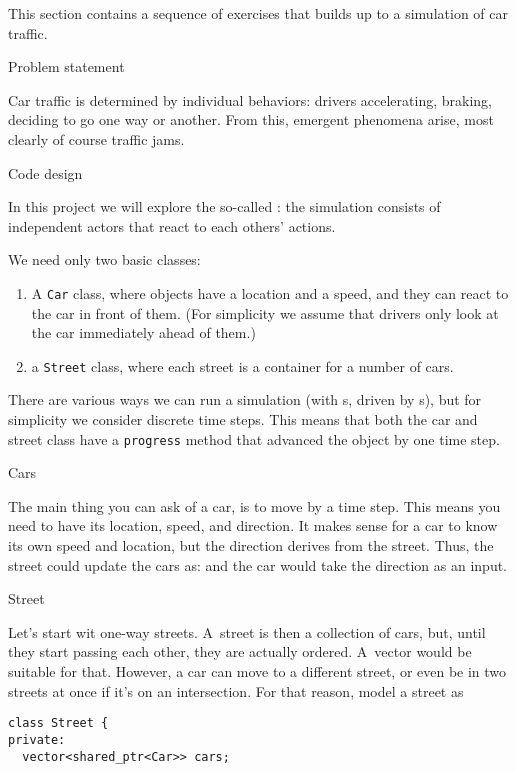 
This section contains a sequence of exercises that builds up to a
simulation of car traffic.

 {Problem statement}

Car traffic is determined by individual behaviors:
drivers accelerating, braking, deciding to go one way or another.
From this, emergent phenomena arise,
most clearly of course traffic jams.

 {Code design}

In this project we will explore the so-called :
the simulation consists of independent actors that react to each others' actions.

We need only two basic classes:
\begin{enumerate}
\item A \lstinline{Car} class, where objects have a location and a speed,
  and they can react to the car in front of them.
  (For simplicity we assume that drivers only look at the car immediately ahead of them.)
\item a \lstinline{Street} class, where each street is a container for a number of cars.
\end{enumerate}

There are various ways we can run a simulation
(with s, driven by s),
but for simplicity we consider discrete time steps.
This means that both the car and street class have a \lstinline{progress}
method that advanced the object by one time step.

 {Cars}

The main thing you can ask of a car, is to move by a time step.
This means you need to have its location, speed, and direction.
It makes sense for a car to know its own speed and location,
but the direction derives from the street.
Thus, the street could update the cars as:
%
%
and the car would take the direction as an input.

 {Street}

Let's start wit one-way streets.
A~street is then a collection of cars, but,
until they start passing each other,
they are actually ordered.
A~vector would be suitable for that.
However, a car can move to a different street,
or even be in two streets at once if it's on an intersection.
For that reason, model a street as
\begin{lstlisting}
class Street {
private:
  vector<shared_ptr<Car>> cars;
\end{lstlisting}

